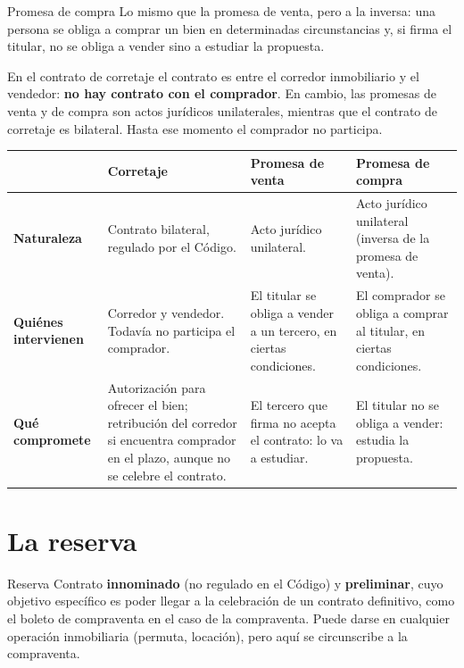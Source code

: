 \documentclass[12pt,oneside]{book}
\begin{document}
\begin{definition}{Promesa de compra}
Lo mismo que la promesa de venta, pero a la inversa: una persona se obliga a comprar un bien en determinadas circunstancias y, si firma el titular, no se obliga a vender sino a estudiar la propuesta.
\end{definition}

En el contrato de corretaje el contrato es entre el corredor inmobiliario y el vendedor: \textbf{no hay contrato con el comprador}. En cambio, las promesas de venta y de compra son actos jurídicos unilaterales, mientras que el contrato de corretaje es bilateral. Hasta ese momento el comprador no participa.

\begin{table}[H]
\centering
\small
\begin{tabularx}{\textwidth}{@{}>{\raggedright\arraybackslash}p{}>{\raggedright\arraybackslash}X>{\raggedright\arraybackslash}X>{\raggedright\arraybackslash}X@{}}
\toprule
 & \textbf{Corretaje} & \textbf{Promesa de venta} & \textbf{Promesa de compra} \\
\midrule
\textbf{Naturaleza} & Contrato bilateral, regulado por el Código. & Acto jurídico unilateral. & Acto jurídico unilateral (inversa de la promesa de venta). \\
\textbf{Quiénes intervienen} & Corredor y vendedor. Todavía no participa el comprador. & El titular se obliga a vender a un tercero, en ciertas condiciones. & El comprador se obliga a comprar al titular, en ciertas condiciones. \\
\textbf{Qué compromete} & Autorización para ofrecer el bien; retribución del corredor si encuentra comprador en el plazo, aunque no se celebre el contrato. & El tercero que firma no acepta el contrato: lo va a estudiar. & El titular no se obliga a vender: estudia la propuesta. \\
\bottomrule
\end{tabularx}
\end{table}

\section{La reserva}

\begin{definition}{Reserva}
Contrato \textbf{innominado} (no regulado en el Código) y \textbf{preliminar}, cuyo objetivo específico es poder llegar a la celebración de un contrato definitivo, como el boleto de compraventa en el caso de la compraventa. Puede darse en cualquier operación inmobiliaria (permuta, locación), pero aquí se circunscribe a la compraventa.
\end{definition}
\end{document}
